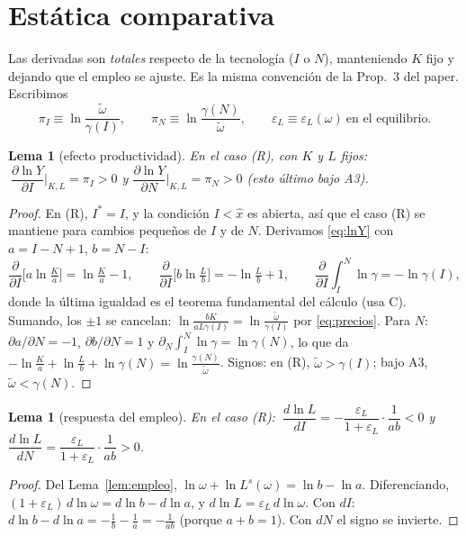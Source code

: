 \documentclass[11pt,a4paper]{article}
\numberwithin{equation}{section}
\theoremstyle{definition}
\theoremstyle{plain}
\newtheorem{lema}[definicion]{Lema}
\theoremstyle{remark}
\newcommand{\Is}{I^{*}}
\newcommand{\eps}{\varepsilon}
\newcommand{\wt}{\tilde\omega}
\begin{document}
\section{Estática comparativa}

Las derivadas son \emph{totales} respecto de la tecnología ($I$ o $N$), manteniendo $K$ fijo y dejando que el
empleo se ajuste. Es la misma convención de la Prop.~3 del paper. Escribimos
\[
  \pi_I\equiv\ln\frac{\wt}{\gamma(I)},\qquad \pi_N\equiv\ln\frac{\gamma(N)}{\wt},\qquad
  \eps_L\equiv\eps_L(\omega)\ \text{en el equilibrio}.
\]

\begin{lema}[efecto productividad]\label{lem:prod}
En el caso (R), con $K$ y $L$ fijos: $\ \dfrac{\partial\ln Y}{\partial I}\Big|_{K,L}=\pi_I>0$ y
$\dfrac{\partial\ln Y}{\partial N}\Big|_{K,L}=\pi_N>0$ (esto último bajo \textsf{A3}).
\end{lema}
\begin{proof}
En (R), $\Is=I$, y la condición $I<\hat x$ es abierta, así que el caso (R) se mantiene para cambios pequeños de $I$ y
de $N$. Derivamos \eqref{eq:lnY} con $a=I-N+1$, $b=N-I$:
\[
  \frac{\partial}{\partial I}\Big[a\ln\tfrac Ka\Big]=\ln\tfrac Ka-1,\qquad
  \frac{\partial}{\partial I}\Big[b\ln\tfrac Lb\Big]=-\ln\tfrac Lb+1,\qquad
  \frac{\partial}{\partial I}\int_I^N\ln\gamma=-\ln\gamma(I),
\]
donde la última igualdad es el teorema fundamental del cálculo (usa \textsf{C}). Sumando, los $\pm1$ se cancelan:
$\ln\frac{bK}{aL\gamma(I)}=\ln\frac{\wt}{\gamma(I)}$ por \eqref{eq:precios}. Para $N$: $\partial a/\partial N=-1$,
$\partial b/\partial N=1$ y $\partial_N\int_I^N\ln\gamma=\ln\gamma(N)$, lo que da
$-\ln\frac Ka+\ln\frac Lb+\ln\gamma(N)=\ln\frac{\gamma(N)}{\wt}$. Signos: en (R), $\wt>\gamma(I)$; bajo \textsf{A3},
$\wt<\gamma(N)$.
\end{proof}

\begin{lema}[respuesta del empleo]\label{lem:dL}
En el caso (R):
$\ \dfrac{d\ln L}{dI}=-\dfrac{\eps_L}{1+\eps_L}\cdot\dfrac{1}{ab}<0$ y $\dfrac{d\ln L}{dN}=\dfrac{\eps_L}{1+\eps_L}\cdot\dfrac{1}{ab}>0$.
\end{lema}
\begin{proof}
Del Lema~\ref{lem:empleo}, $\ln\omega+\ln L^s(\omega)=\ln b-\ln a$. Diferenciando,
$(1+\eps_L)\,d\ln\omega=d\ln b-d\ln a$, y $d\ln L=\eps_L\,d\ln\omega$. Con $dI$: $d\ln b-d\ln a=-\frac1b-\frac1a=-\frac{1}{ab}$
(porque $a+b=1$). Con $dN$ el signo se invierte.
\end{proof}
\end{document}
